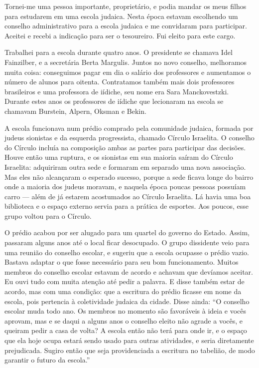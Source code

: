 Tornei-me uma pessoa importante, proprietário, e podia mandar os meus
filhos para estudarem em uma escola judaica. Nesta época estavam
escolhendo um conselho administrativo para a escola judaica e me
convidaram para participar. Aceitei e recebi a indicação para ser o
tesoureiro. Fui eleito para este cargo. 

Trabalhei para a escola durante
quatro anos. O presidente se chamava Idel Fainzilber, e a secretária
Berta Margulis. Juntos no novo conselho, melhoramos muita coisa:
conseguimos pagar em dia o salário dos professores e aumentamos o número
de alunos para oitenta. Contratamos também mais dois professores brasileiros e uma
professora de iídiche, seu nome era Sara Manckovestzki. Durante estes
anos os professores de iídiche que lecionaram na escola se chamavam
Burstein, Alpern, Oksman e Bekin.

A escola funcionava num prédio comprado pela comunidade judaica, formada por 
judeus sionistas e da esquerda progressista, chamado
Círculo Israelita.  O conselho do Círculo incluía na composição ambas
as partes para participar das decisões. Houve então uma ruptura, e os
sionistas em sua maioria saíram do Círculo Israelita: adquiriram outra
sede e formaram em separado uma nova associação. Mas eles não alcançaram
o esperado sucesso, porque a sede ficava longe do bairro onde a maioria
dos judeus moravam, e naquela época poucas pessoas possuíam carro --- além de já
estarem acostumados ao Círculo Israelita. Lá havia uma boa
biblioteca e o espaço externo servia para a prática de
esportes. Aos poucos, esse grupo voltou para o Círculo.

O prédio acabou por ser alugado para um quartel do governo do Estado. Assim, passaram
alguns anos até o local ficar desocupado. O grupo dissidente veio para
uma reunião do conselho escolar, e sugeriu que a escola 
ocupasse o prédio vazio. Bastava adaptar o que fosse necessário
para seu bom funcionamento. Muitos membros do conselho escolar
estavam de acordo e achavam que devíamos aceitar. Eu ouvi
tudo com muita atenção até pedir a palavra. E disse também estar de acordo, mas com uma condição: que a escritura do prédio ficasse em nome da escola, pois pertencia à 
coletividade judaica da cidade. Disse ainda: ``O conselho escolar muda todo ano. Os membros no momento são favoráveis à ideia e vocês aprovam, mas e se daqui a alguns anos o conselho eleito não agrade a vocês, e queiram pedir a casa de volta? A escola então não terá para onde ir, e o espaço que ela hoje ocupa estará sendo usado para outras atividades, e seria diretamente 
prejudicada. Sugiro então que seja providenciada a escritura no tabelião,
de modo garantir o futuro da escola.''


